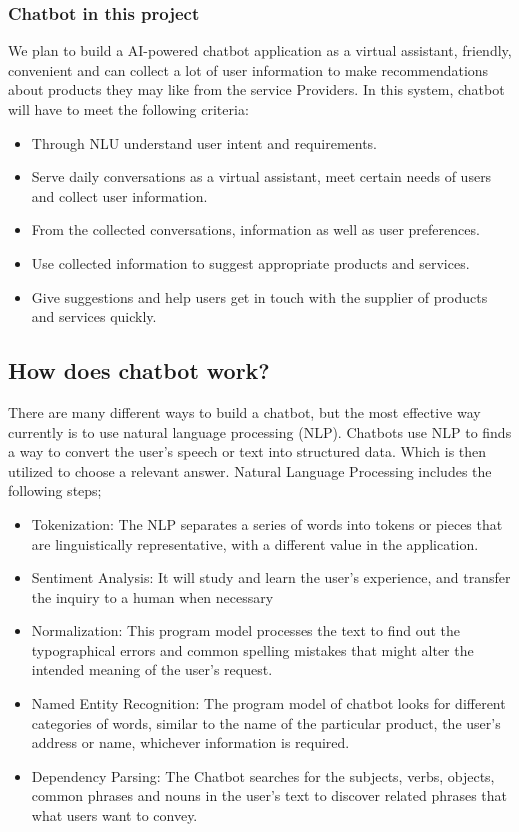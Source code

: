 \subsubsection{Chatbot in this project}

We plan to build a AI-powered chatbot application as a virtual assistant, friendly, convenient and can collect a lot of user information to make recommendations about products they may like from the service Providers. In this system, chatbot will have to meet the following criteria:
\begin{itemize}
\item Through NLU understand user intent and requirements.
\item Serve daily conversations as a virtual assistant, meet certain needs of users and collect user information.
\item From the collected conversations, information as well as user preferences.
\item Use collected information to suggest appropriate products and services.
\item Give suggestions and help users get in touch with the supplier of products and services quickly.
\end{itemize}

\subsection{How does chatbot work?}

There are many different ways to build a chatbot, but the most effective way currently is to use natural language processing (NLP).
Chatbots use NLP to finds a way to convert the user’s speech or text into structured data. Which is then utilized to choose a relevant answer. Natural Language Processing includes the following steps;


\begin{itemize}
\item Tokenization: The NLP separates a series of words into tokens or pieces that are linguistically representative, with a different value in the application.
\item Sentiment Analysis: It will study and learn the user’s experience, and transfer the inquiry to a human when necessary
\item Normalization: This program model processes the text to find out the typographical errors and common spelling mistakes that might alter the intended meaning of the user’s request.
\item Named Entity Recognition: The program model of chatbot looks for different categories of words, similar to the name of the particular product, the user’s address or name, whichever information is required.
\item Dependency Parsing: The Chatbot searches for the subjects, verbs, objects, common phrases and nouns in the user’s text to discover related phrases that what users want to convey.
\end{itemize}

